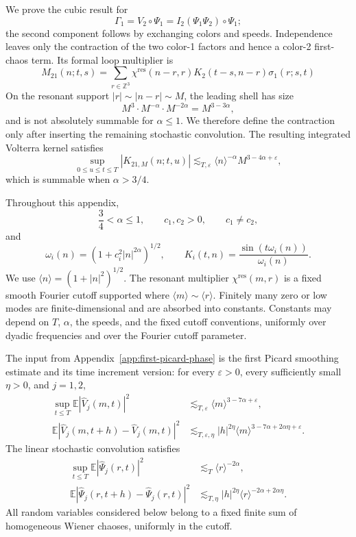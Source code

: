 \documentclass[10pt]{amsart}
\numberwithin{equation}{section}
\theoremstyle{plain}
\theoremstyle{definition}
\theoremstyle{remark}
\newcommand{\Z}{\mathbb{Z}}
\newcommand{\E}{\mathbb{E}}
\newcommand{\eps}{\varepsilon}
\newcommand{\la}{\langle}
\newcommand{\ra}{\rangle}
\newcommand{\wh}{\widehat}
\begin{document}
We prove the cubic result for
\[
        \Gamma_1=V_2\circ\Psi_1=I_2(\Psi_1\Psi_2)\circ\Psi_1;
\]
the second component follows by exchanging colors and speeds.  Independence leaves only the contraction of the two color-1 factors and hence a color-2 first-chaos term.  Its formal loop multiplier is
\begin{equation}\label{C:formal-M21-intro}
        M_{21}(n;t,s)
        =\sum_{r\in\Z^3}
        \chi^{\mathrm{res}}(n-r,r)K_2(t-s,n-r)\sigma_1(r;s,t)
\end{equation}
On the resonant support \(|r|\sim |n-r|\sim M\), the leading shell has size
\[
        M^3\cdot M^{-\alpha}\cdot M^{-2\alpha}=M^{3-3\alpha},
\]
and is not absolutely summable for \(\alpha\le1\).  We therefore define the contraction only after inserting the remaining stochastic convolution.  The resulting integrated Volterra kernel satisfies
\begin{equation}\label{C:K21-main-intro}
        \sup_{0\le u\le t\le T}|K_{21,M}(n;t,u)|
        \lesssim_{T,\eps} \la n\ra^{-\alpha}M^{3-4\alpha+\eps},
\end{equation}
which is summable when \(\alpha>3/4\).

Throughout this appendix,
\[
        \frac34<\alpha\le1,
        \qquad c_1,c_2>0,
        \qquad c_1\ne c_2,
\]
and
\[
        \omega_i(n)=(1+c_i^2|n|^{2\alpha})^{1/2},
        \qquad
        K_i(t,n)=\frac{\sin(t\omega_i(n))}{\omega_i(n)}.
\]
We use \(\la n\ra=(1+|n|^2)^{1/2}\).  The resonant multiplier \(\chi^{\mathrm{res}}(m,r)\) is a fixed smooth Fourier cutoff supported where \(\la m\ra\sim\la r\ra\).  Finitely many zero or low modes are finite-dimensional and are absorbed into constants.  Constants may depend on \(T\), \(\alpha\), the speeds, and the fixed cutoff conventions, uniformly over dyadic frequencies and over the Fourier cutoff parameter.

The input from Appendix~\ref{app:first-picard-phase} is the first Picard smoothing estimate and its time increment version: for every \(\eps>0\), every sufficiently small \(\eta>0\), and \(j=1,2\),
\begin{align}
        \sup_{t\le T}\E |\wh V_j(m,t)|^2
        &\lesssim_{T,\eps} \la m\ra^{3-7\alpha+\eps},\label{C:Picard-input}\\
        \E |\wh V_j(m,t+h)-\wh V_j(m,t)|^2
        &\lesssim_{T,\eps,\eta}
        |h|^{2\eta}\la m\ra^{3-7\alpha+2\alpha\eta+\eps}.\label{C:Picard-increment-input}
\end{align}
The linear stochastic convolution satisfies
\begin{align}
        \sup_{t\le T}\E |\wh\Psi_j(r,t)|^2
        &\lesssim_T \la r\ra^{-2\alpha},\label{C:linear-input}\\
        \E |\wh\Psi_j(r,t+h)-\wh\Psi_j(r,t)|^2
        &\lesssim_{T,\eta}|h|^{2\eta}\la r\ra^{-2\alpha+2\alpha\eta}.
        \label{C:linear-increment-input}
\end{align}
All random variables considered below belong to a fixed finite sum of homogeneous Wiener chaoses, uniformly in the cutoff.
\end{document}
